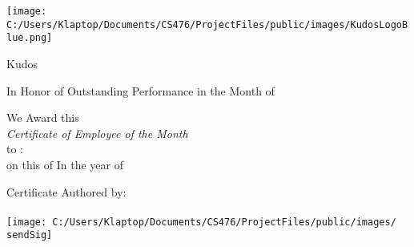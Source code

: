 \documentclass[landscape, 14pt]{article}
\begin{document}
\centering
\begin{minipage}{.9\textwidth}
\centering
\texttt{[image: C:/Users/Klaptop/Documents/CS476/ProjectFiles/public/images/KudosLogoBlue.png]}
\end{minipage}

\Huge Kudos\\
\vspace{1cm}

\Huge In Honor of Outstanding Performance in the Month of
 \monVar \par
\smallskip
{\Large We Award this\\}
\smallskip
\textit{\huge Certificate of Employee of the Month\\}
\smallskip
{\Large to : \recvVar\\}
\smallskip
{\large on this \dayVar of \monVar In the year of \yearVar\\}
\vspace{.5cm}
\begin{minipage}[t]{0.5\textwidth}
\centering
{\large Certificate Authored by:\\}
{\large \sendVar\\}
\texttt{[image: C:/Users/Klaptop/Documents/CS476/ProjectFiles/public/images/\\sendSig]}
\end{minipage}
\end{document}
